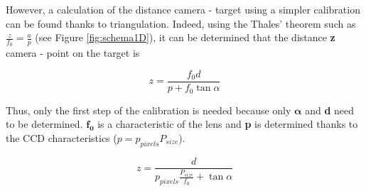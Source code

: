 However, a calculation of the distance camera - target using a simpler calibration can be found thanks to triangulation. Indeed, using the Thales' theorem such as $\frac{z}{f_0} = \frac{a}{p}$ (see Figure \ref{fig:schema1D}), it can be determined that the distance \textbf{z} camera - point on the target is


\begin{equation*}
z = \frac{f_0d}{p+f_0 \tan \alpha}
\end{equation*}

Thus, only the first step of the calibration is needed because only $\bm{\alpha}$ and \textbf{d} need to be determined. $\bm{f_0}$ is a characteristic of the lens and \textbf{p} is determined thanks to the CCD characteristics ($p = p_{pixels} P_{size}$).

\begin{equation}
z = \frac{d}{p_{pixels}\frac{P_{size}}{f_0}+ \tan \alpha}
\label{eq:formule1D_2}
\end{equation}